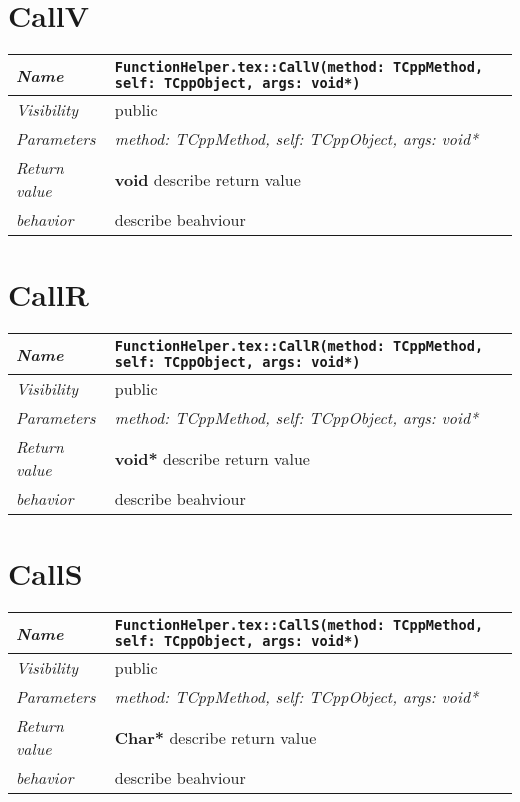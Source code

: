  \section{CallV}
\begin{longtable}{p{3cm} @{\hskip 1cm} p{12cm}}
 \hline
\textit{Name} & \texttt{FunctionHelper.tex::CallV(method: TCppMethod, self: TCppObject, args: void*)}\\
\hline
 \textit{Visibility} & public\\
\hline
\textit{Parameters} & \textit{method: TCppMethod, self: TCppObject, args: void*}\\
\hline
\textit{Return value} & \textbf{ void} describe return value\\
  \hline
 \textit{behavior} & describe beahviour \\
\hline
\end{longtable} \pagebreak
 \section{CallR}
\begin{longtable}{p{3cm} @{\hskip 1cm} p{12cm}}
 \hline
\textit{Name} & \texttt{FunctionHelper.tex::CallR(method: TCppMethod, self: TCppObject, args: void*)}\\
\hline
 \textit{Visibility} & public\\
\hline
\textit{Parameters} & \textit{method: TCppMethod, self: TCppObject, args: void*}\\
\hline
\textit{Return value} & \textbf{ void*} describe return value\\
  \hline
 \textit{behavior} & describe beahviour \\
\hline
\end{longtable} \pagebreak
 \section{CallS}
\begin{longtable}{p{3cm} @{\hskip 1cm} p{12cm}}
 \hline
\textit{Name} & \texttt{FunctionHelper.tex::CallS(method: TCppMethod, self: TCppObject, args: void*)}\\
\hline
 \textit{Visibility} & public\\
\hline
\textit{Parameters} & \textit{method: TCppMethod, self: TCppObject, args: void*}\\
\hline
\textit{Return value} & \textbf{ Char*} describe return value\\
  \hline
 \textit{behavior} & describe beahviour \\
\hline
\end{longtable} \pagebreak
